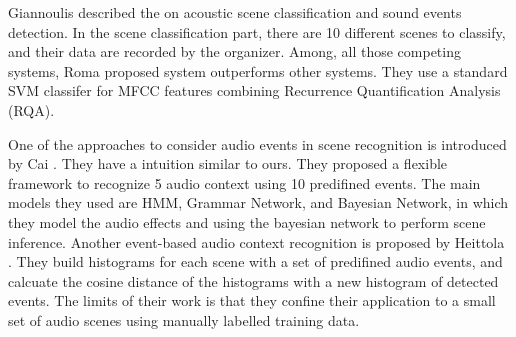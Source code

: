 Giannoulis \et \cite{giannoulis2013applications} described the on acoustic scene classification and sound events detection.  
In the scene classification part, there are 10 different scenes to classify, and their data are recorded by the organizer. 
Among, all those competing systems, Roma \et \cite{romarecurrence} proposed system outperforms other systems. 
They use a standard SVM classifer for MFCC features combining Recurrence Quantification Analysis (RQA). 

One of the approaches to consider audio events in scene recognition is introduced by Cai \et \cite{cai2006flexible}. 
They have a intuition similar to ours. 
They proposed a flexible framework to recognize 5 audio context using 10 predifined events. 
The main models they used are HMM, Grammar Network, and Bayesian Network, in which they model the audio effects and using the bayesian network to perform scene inference. 
Another event-based audio context recognition is proposed by Heittola \et \cite{heittola2010audio}. 
They build histograms for each scene with a set of predifined audio events, and calcuate the cosine distance of the histograms with a new histogram of detected events.
The limits of their work is that they confine their application to a small set of audio scenes using manually labelled training data. 


